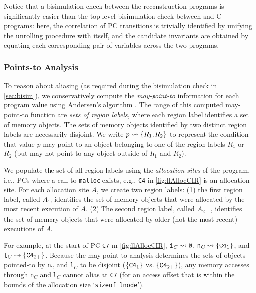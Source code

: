 Notice that a bisimulation check
between the reconstruction programs is significantly
easier than the top-level bisimulation check between \SpecL{}
and C programs: here,
the correlation of PC transitions is trivially
identified by unifying the unrolling procedure with itself, and
the candidate invariants
are obtained by equating each corresponding pair
of variables across
the two programs.

\subsubsection{Points-to Analysis}
\label{sec:pointsTo}
To reason about aliasing (as required during the bisimulation
check in \cref{sec:bisim}), we conservatively compute the
{\em may-point-to}
information for each program value using Andersen's algorithm \cite{andersen94programanalysis}.
The range of this computed
may-point-to function are {\em sets of region labels}, where
each region label identifies a set of memory objects.
The sets of memory objects identified by two distinct region
labels are necessarily disjoint. We write $p\rightsquigarrow\{R_1,R_2\}$
to represent the condition that value $p$ may point to
an object belonging to one of the region labels $R_1$ or $R_2$ (but
may not point to any object outside of $R_1$ and $R_2$).

We populate the set of all region labels using the
{\em allocation
sites} of the program, i.e., PCs where a call to
{\tt malloc} exists, e.g., {\tt C4}
in \cref{fig:llAllocCIR} is an allocation site.
For each allocation site $A$, we create
two region labels: (1) the first region label, called $A_1$,
identifies the set of memory
objects that were allocated by the most recent execution of $A$. (2) The second
region label, called $A_{2+}$, identifies
the set of memory objects that were allocated by older (not the most
recent) executions of $A$.

For example, at the start of PC {\tt C7} in \cref{fig:llAllocCIR},
{\tt i}$_C\rightsquigarrow{}\emptyset$,
{\tt n}$_C\rightsquigarrow{}\{{\tt C4}_1\}$,
and {\tt l}$_C\rightsquigarrow{}\{{\tt C4}_{2+}\}$.
Because the may-point-to analysis determines the
sets of objects pointed-to by {\tt n}$_C$ and {\tt l}$_C$ to
be disjoint ($\{{\tt C4_{1}}\}$ vs. $\{{\tt C4_{2+}}\}$), any
memory accesses through {\tt n}$_C$ and {\tt l}$_C$
cannot alias at {\tt C7} (for an access
offset that is within the bounds of
the allocation size `{\tt sizeof lnode}').

